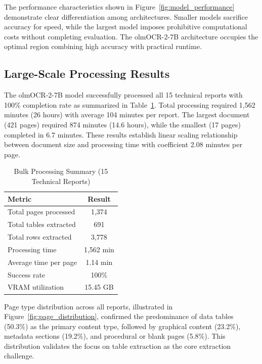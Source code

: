 \documentclass{svproc}
\begin{document}
The performance characteristics shown in Figure~\ref{fig:model_performance} demonstrate clear differentiation among architectures. Smaller models sacrifice accuracy for speed, while the largest model imposes prohibitive computational costs without completing evaluation. The olmOCR-2-7B architecture occupies the optimal region combining high accuracy with practical runtime.

\subsection{Large-Scale Processing Results}

The olmOCR-2-7B model successfully processed all 15 technical reports with 100\% completion rate as summarized in Table~\ref{tab:bulk_results}. Total processing required 1,562 minutes (26 hours) with average 104 minutes per report. The largest document (421 pages) required 874 minutes (14.6 hours), while the smallest (17 pages) completed in 6.7 minutes. These results establish linear scaling relationship between document size and processing time with coefficient 2.08 minutes per page.

\begin{table}[htbp]
\caption{Bulk Processing Summary (15 Technical Reports)}
\label{tab:bulk_results}
\begin{center}
\small
\begin{tabular}{lc}
\toprule
\textbf{Metric} & \textbf{Result} \\
\midrule
Total pages processed & 1,374 \\
Total tables extracted & 691 \\
Total rows extracted & 3,778 \\
Processing time & 1,562 min \\
Average time per page & 1.14 min \\
Success rate & 100\% \\
VRAM utilization & 15.45 GB \\
\bottomrule
\end{tabular}
\end{center}
\end{table}

Page type distribution across all reports, illustrated in Figure~\ref{fig:page_distribution}, confirmed the predominance of data tables (50.3\%) as the primary content type, followed by graphical content (23.2\%), metadata sections (19.2\%), and procedural or blank pages (5.8\%). This distribution validates the focus on table extraction as the core extraction challenge.
\end{document}
